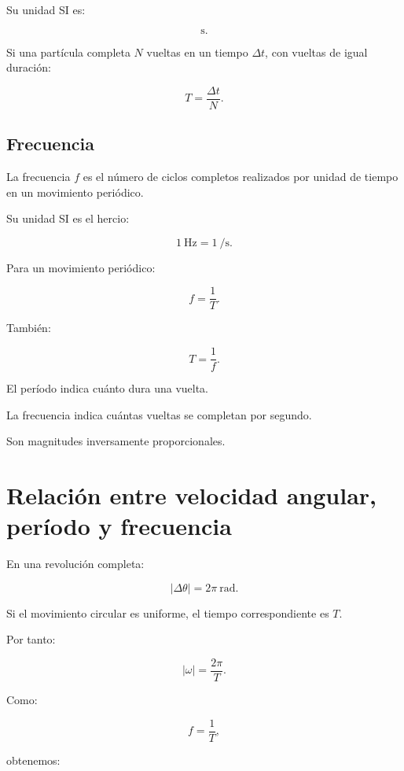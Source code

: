 Su unidad SI es:

\[
\si{\second}.
\]

Si una partícula completa \(N\) vueltas en un tiempo \(\Delta t\), con vueltas
de igual duración:

\[
\boxed{
T=\frac{\Delta t}{N}
}.
\]


\subsection{Frecuencia}

\begin{definicion}[Frecuencia]

La frecuencia \(f\) es el número de ciclos completos realizados por unidad de
tiempo en un movimiento periódico.

\end{definicion}

Su unidad SI es el hercio:

\[
\SI{1}{\hertz}
=
\SI{1}{\per\second}.
\]

Para un movimiento periódico:

\[
\boxed{
f=\frac{1}{T}
}.
\]

También:

\[
\boxed{
T=\frac{1}{f}
}.
\]

\begin{interpretacion}

El período indica cuánto dura una vuelta.

La frecuencia indica cuántas vueltas se completan por segundo.

Son magnitudes inversamente proporcionales.

\end{interpretacion}


\section{Relación entre velocidad angular, período y frecuencia}

En una revolución completa:

\[
|\Delta\theta|=2\pi\ \si{\radian}.
\]

Si el movimiento circular es uniforme, el tiempo correspondiente es \(T\).

Por tanto:

\[
|\omega|
=
\frac{2\pi}{T}.
\]

Como:

\[
f=\frac{1}{T},
\]

obtenemos:

